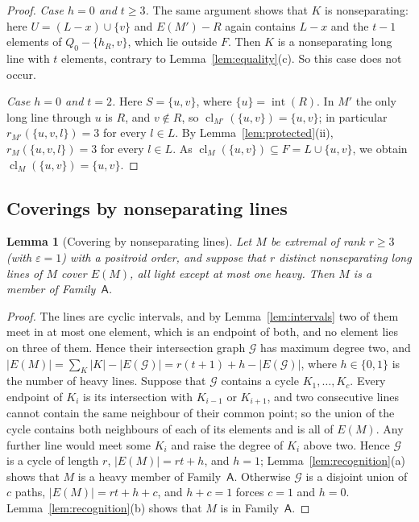 \documentclass[11pt]{amsart}
\newtheorem{lemma}[theorem]{Lemma}
\theoremstyle{definition}
\theoremstyle{remark}
\numberwithin{equation}{section}
\newcommand{\cl}{\operatorname{cl}}
\newcommand{\FA}{\mathsf{A}}
\begin{document}
\begin{proof}
\emph{Case $h=0$ and $t\ge3$.} The same argument shows that $K$ is nonseparating: here $U=(L-x)\cup\{v\}$ and $E(M')-R$ again contains $L-x$ and the $t-1$ elements of $Q_0-\{h_R,v\}$, which lie outside $F$. Then $K$ is a nonseparating long line with $t$ elements, contrary to Lemma~\ref{lem:equality}(c). So this case does not occur.

\emph{Case $h=0$ and $t=2$.} Here $S=\{u,v\}$, where $\{u\}=\operatorname{int}(R)$. In $M'$ the only long line through $u$ is $R$, and $v\notin R$, so $\cl_{M'}(\{u,v\})=\{u,v\}$; in particular $r_{M'}(\{u,v,l\})=3$ for every $l\in L$. By Lemma~\ref{lem:protected}(ii), $r_M(\{u,v,l\})=3$ for every $l\in L$. As $\cl_M(\{u,v\})\subseteq F=L\cup\{u,v\}$, we obtain $\cl_M(\{u,v\})=\{u,v\}$.
\end{proof}

\subsection{Coverings by nonseparating lines}

\begin{lemma}[Covering by nonseparating lines]\label{lem:covered}
Let $M$ be extremal of rank $r\ge3$ \textup{(}with $\varepsilon=1$\textup{)} with a positroid order, and suppose that $r$ distinct nonseparating long lines of $M$ cover $E(M)$, all light except at most one heavy. Then $M$ is a member of Family~$\FA$.
\end{lemma}

\begin{proof}
The lines are cyclic intervals, and by Lemma~\ref{lem:intervals} two of them meet in at most one element, which is an endpoint of both, and no element lies on three of them. Hence their intersection graph $\mathcal G$ has maximum degree two, and $|E(M)|=\sum_K|K|-|E(\mathcal G)|=r(t+1)+h-|E(\mathcal G)|$, where $h\in\{0,1\}$ is the number of heavy lines. Suppose that $\mathcal G$ contains a cycle $K_1,\dots,K_c$. Every endpoint of $K_i$ is its intersection with $K_{i-1}$ or $K_{i+1}$, and two consecutive lines cannot contain the same neighbour of their common point; so the union of the cycle contains both neighbours of each of its elements and is all of $E(M)$. Any further line would meet some $K_i$ and raise the degree of $K_i$ above two. Hence $\mathcal G$ is a cycle of length $r$, $|E(M)|=rt+h$, and $h=1$; Lemma~\ref{lem:recognition}(a) shows that $M$ is a heavy member of Family~$\FA$. Otherwise $\mathcal G$ is a disjoint union of $c$ paths, $|E(M)|=rt+h+c$, and $h+c=1$ forces $c=1$ and $h=0$. Lemma~\ref{lem:recognition}(b) shows that $M$ is in Family~$\FA$.
\end{proof}
\end{document}
